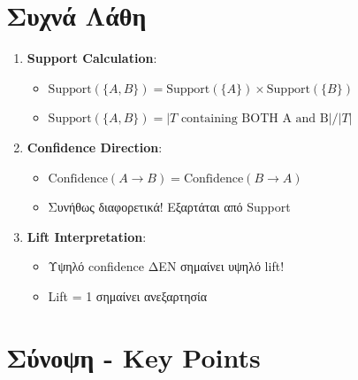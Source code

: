 \section{Συχνά Λάθη}

\begin{warningbox}
\begin{enumerate}
    \item \textbf{Support Calculation}:
    \begin{itemize}
        \item[$\times$] $\text{Support}(\{A,B\}) = \text{Support}(\{A\}) \times \text{Support}(\{B\})$
        \item[\checkmark] $\text{Support}(\{A,B\}) = |T \text{ containing BOTH A and B}| / |T|$
    \end{itemize}

    \item \textbf{Confidence Direction}:
    \begin{itemize}
        \item[$\times$] $\text{Confidence}(A \to B) = \text{Confidence}(B \to A)$
        \item[\checkmark] Συνήθως διαφορετικά! Εξαρτάται από Support
    \end{itemize}

    \item \textbf{Lift Interpretation}:
    \begin{itemize}
        \item Υψηλό confidence ΔΕΝ σημαίνει υψηλό lift!
        \item Lift = 1 σημαίνει ανεξαρτησία
    \end{itemize}
\end{enumerate}
\end{warningbox}

\section{Σύνοψη - Key Points}

